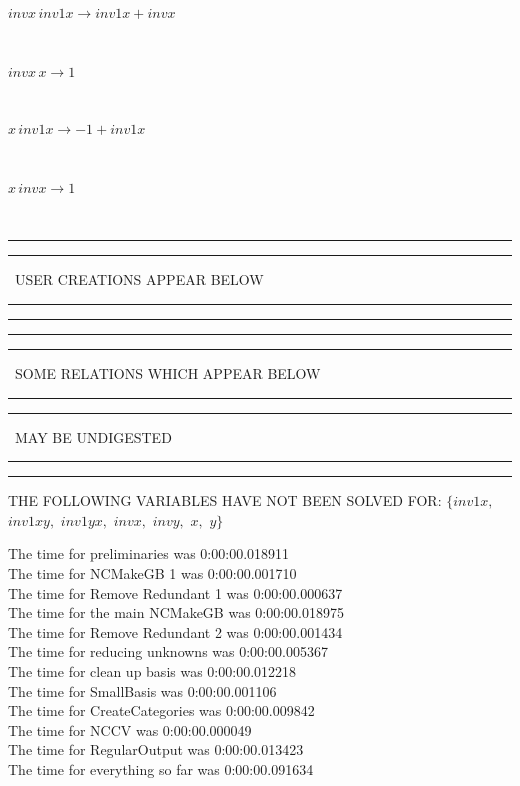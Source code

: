 \documentclass[rep10,leqno]{report}
\begin{document}
\begin{minipage}{6in}
$
invx\,
 inv1x\rightarrow inv1x + invx
$
\end{minipage}\medskip \\
\begin{minipage}{6in}
$
invx\,
 x\rightarrow 1
$
\end{minipage}\medskip \\
\begin{minipage}{6in}
$
x\,
 inv1x\rightarrow -1 + inv1x
$
\end{minipage}\medskip \\
\begin{minipage}{6in}
$
x\,
 invx\rightarrow 1
$
\end{minipage}\\
\rule[2pt]{6in}{1pt}\hfil\break
\rule[2.5pt]{1.701in}{1pt}
\ USER CREATIONS APPEAR BELOW\ 
\rule[2.5pt]{1.701in}{1pt}\hfil\break
\rule[2pt]{6in}{1pt}\hfil\break
\rule[2pt]{6in}{4pt}\hfil\break
\rule[2pt]{1.45in}{4pt}
\ SOME RELATIONS WHICH APPEAR BELOW\ 
\rule[2pt]{1.45in}{4pt}\hfil\break
\rule[2pt]{2.18in}{4pt}
\ MAY BE UNDIGESTED\ 
\rule[2pt]{2.18in}{4pt}\hfil\break
\rule[2pt]{6in}{4pt}\hfil\break
THE FOLLOWING VARIABLES HAVE NOT BEEN SOLVED FOR:\hfil\break
$\{inv1x,
$ $
inv1xy,
$ $
inv1yx,
$ $
invx,
$ $
invy,
$ $
x,
$ $
y\}$
\smallskip\\
\vspace{10pt}

\noindent
The time for preliminaries was 0:00:00.018911\\
The time for NCMakeGB 1 was 0:00:00.001710\\
The time for Remove Redundant 1 was 0:00:00.000637\\
The time for the main NCMakeGB was 0:00:00.018975\\
The time for Remove Redundant 2 was 0:00:00.001434\\
The time for reducing unknowns was 0:00:00.005367\\
The time for clean up basis was 0:00:00.012218\\
The time for SmallBasis was 0:00:00.001106\\
The time for CreateCategories was 0:00:00.009842\\
The time for NCCV was 0:00:00.000049\\
The time for RegularOutput was 0:00:00.013423\\
The time for everything so far was 0:00:00.091634\\
\end{document}
